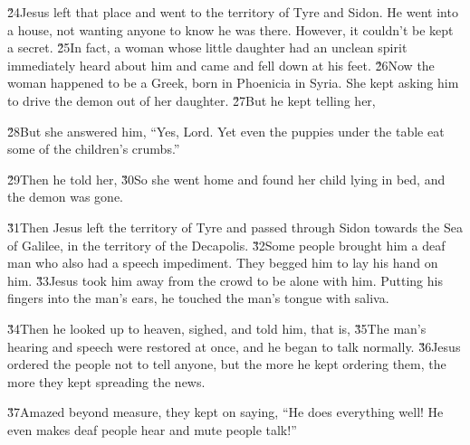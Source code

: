 \v{24}Jesus left that place and went to the territory of Tyre and Sidon. He went into a house, not wanting anyone to know he was there. However, it couldn't be kept a secret. \v{25}In fact, a woman whose little daughter had an unclean spirit immediately heard about him and came and fell down at his feet. \v{26}Now the woman happened to be a Greek, born in Phoenicia in Syria. She kept asking him to drive the demon out of her daughter. \v{27}But he kept telling her, 

\v{28}But she answered him, ``Yes, Lord. Yet even the puppies under the table eat some of the children's crumbs.''

\v{29}Then he told her,  \v{30}So she went home and found her child lying in bed, and the demon was gone.

\v{31}Then Jesus left the territory of Tyre and passed through Sidon towards the Sea of Galilee, in the territory of the Decapolis. \v{32}Some people brought him a deaf man who also had a speech impediment. They begged him to lay his hand on him. \v{33}Jesus took him away from the crowd to be alone with him. Putting his fingers into the man's ears, he touched the man's tongue with saliva.

\v{34}Then he looked up to heaven, sighed, and told him,  that is,  \v{35}The man's hearing and speech were restored at once, and he began to talk normally. \v{36}Jesus ordered the people not to tell anyone, but the more he kept ordering them, the more they kept spreading the news.

\v{37}Amazed beyond measure, they kept on saying, ``He does everything well! He even makes deaf people hear and mute people talk!''

